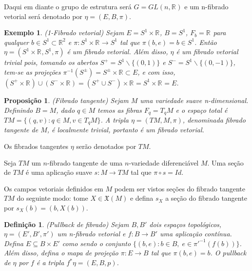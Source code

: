 \documentclass[12pt]{book}
\newtheorem{definicao}[teorema]{Definição}
\newtheorem{exemplo}[teorema]{Exemplo}
\newtheorem{proposicao}[teorema]{Proposição}
\newcommand{\campossuaves}[1]{\mathfrak{X}(#1)}
\newcommand{\real}[1]{\mathbb{R}^{#1}}
\begin{document}
	Daqui em diante o grupo de estrutura será $G = GL(n,\real{})$ e um n-fibrado vetorial será denotado por $\eta = (E,B,\pi)$.
	
	\begin{exemplo}
		(1-Fibrado vetorial) Sejam $E=S^{1} \times \real{}$, $B=S^{1}$, $F_{b} = \real{}$ para qualquer $b \in S^{1}\subset \real{2}$ e $\pi:S^{1} \times \real{}\to S^{1}$ tal que $\pi(b, e)=b \in S^{1}$. Então $\eta=(S^{1} \times \real{}, S^{1}, \pi)$ é um fibrado vetorial. Além disso, $\eta$ é um fibrado vetorial trivial pois, tomando os abertos $S^{+} = S^{1} \backslash \{(0,1)\}$ e $S^{-} = S^{1} \backslash \{(0,-1)\}$, tem-se as projeções $\pi^{-1}(S^{\pm}) = S^{\pm} \times \real{} \subset E$, e com isso, $(S^{+}\times\real{}) \cup ( S^{-}\times\real{}) = (S^{+}\cup S^{-})\times\real{} = S^{1} \times\real{} =E$.
	\end{exemplo}
	
	\begin{proposicao}
		(Fibrado tangente) Sejam $M$ uma variedade suave n-dimensional. Definindo $B=M$, dado $q\in M$ temos as fibras $F_{q} = T_{q}M$ e o espaço total é $TM=\{(q, v): q\in M, v\in T_{q}M \}$. A tripla $\eta = (TM, M, \pi)$, denominada fibrado tangente de $M$, é localmente trivial, portanto é um fibrado vetorial.
	\end{proposicao}

	Os fibrados tangentes $\eta$ serão denotados por $TM$.
 
 	Seja $TM$ um $n$-fibrado tangente de uma $n$-variedade diferenciável $M$. Uma seção de $TM$ é uma aplicação suave $s:M \to TM$ tal que $\pi\circ s=Id$.
	
	Os campos vetoriais definidos em $M$ podem ser vistos seções do fibrado tangente $TM$ do seguinte modo: tome $X\in \campossuaves{M}$ e defina $s_{X}$ a seção do fibrado tangente por $s_{X}(b) = (b, X(b))$.
	
	\begin{definicao}
		(Pullback de fibrado) Sejam $B, B'$ dois espaços topológicos, $\eta=(E', B', \pi')$ um n-fibrado vetorial e $f:B\to B'$ uma aplicação contínua. Defina $E \subseteq B\times E'$ como sendo o conjunto $\{(b, e): b \in B,\; e \in \pi'^{-1}(f(b)) \}$. Além disso, defina o mapa de projeção $\pi:E\to B$ tal que $\pi(b,e) = b$. O pullback de $\eta$ por $f$ é a tripla $f^{*}\eta = (E,B, p)$.
	\end{definicao}
	
\end{document}
